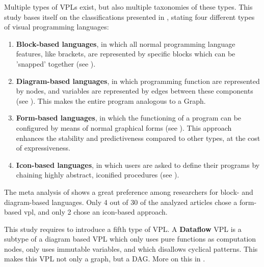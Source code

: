 Multiple types of \ac{VPL}s exist, but also multiple taxonomies of these types.
This study bases itself on the classifications presented in \citet{kuhail_characterizing_2021}, stating four different types of visual programming languages: 
\begin{enumerate}
  \item \textbf{Block-based languages}, in which all normal programming language \\ features, like brackets, are represented by specific blocks which can be 'snapped' together (see ).
  \item \textbf{Diagram-based languages}, in which programming function are represented by nodes, and variables are represented by edges between these components (see ). This makes the entire program analogous to a Graph.
  \item \textbf{Form-based languages}, in which the functioning of a program can be configured by means of normal graphical forms (see ). 
  This approach enhances the stability and predictiveness compared to other types, at the cost of expressiveness.
  \item \textbf{Icon-based languages}, in which users are asked to define their programs by chaining highly abstract, iconified procedures (see ). 
\end{enumerate}

The meta analysis of \cite{kuhail_characterizing_2021} shows a great preference among researchers for block- and diagram-based languages. 
Only 4 out of 30 of the analyzed articles chose a form-based vpl, and only 2 chose an icon-based approach.  

This study requires to introduce a fifth type of VPL. 
A \textbf{Dataflow} VPL is a subtype of a diagram based VPL which only uses pure functions as computation nodes, only uses immutable variables, and which disallows cyclical patterns. This makes this VPL not only a graph, but a \ac{DAG}.
More on this in .


